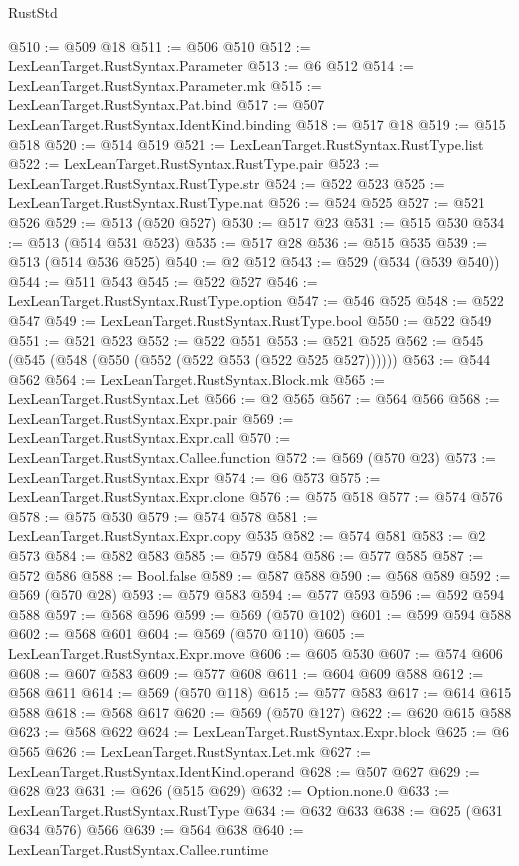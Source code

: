 \begin{lexlean}{RustStd}
\begin{coremodule}
@510 := @509 @18
@511 := @506 @510
@512 := LexLeanTarget.RustSyntax.Parameter
@513 := @6 @512
@514 := LexLeanTarget.RustSyntax.Parameter.mk
@515 := LexLeanTarget.RustSyntax.Pat.bind
@517 := @507 LexLeanTarget.RustSyntax.IdentKind.binding
@518 := @517 @18
@519 := @515 @518
@520 := @514 @519
@521 := LexLeanTarget.RustSyntax.RustType.list
@522 := LexLeanTarget.RustSyntax.RustType.pair
@523 := LexLeanTarget.RustSyntax.RustType.str
@524 := @522 @523
@525 := LexLeanTarget.RustSyntax.RustType.nat
@526 := @524 @525
@527 := @521 @526
@529 := @513 (@520 @527)
@530 := @517 @23
@531 := @515 @530
@534 := @513 (@514 @531 @523)
@535 := @517 @28
@536 := @515 @535
@539 := @513 (@514 @536 @525)
@540 := @2 @512
@543 := @529 (@534 (@539 @540))
@544 := @511 @543
@545 := @522 @527
@546 := LexLeanTarget.RustSyntax.RustType.option
@547 := @546 @525
@548 := @522 @547
@549 := LexLeanTarget.RustSyntax.RustType.bool
@550 := @522 @549
@551 := @521 @523
@552 := @522 @551
@553 := @521 @525
@562 := @545 (@545 (@548 (@550 (@552 (@522 @553 (@522 @525 @527))))))
@563 := @544 @562
@564 := LexLeanTarget.RustSyntax.Block.mk
@565 := LexLeanTarget.RustSyntax.Let
@566 := @2 @565
@567 := @564 @566
@568 := LexLeanTarget.RustSyntax.Expr.pair
@569 := LexLeanTarget.RustSyntax.Expr.call
@570 := LexLeanTarget.RustSyntax.Callee.function
@572 := @569 (@570 @23)
@573 := LexLeanTarget.RustSyntax.Expr
@574 := @6 @573
@575 := LexLeanTarget.RustSyntax.Expr.clone
@576 := @575 @518
@577 := @574 @576
@578 := @575 @530
@579 := @574 @578
@581 := LexLeanTarget.RustSyntax.Expr.copy @535
@582 := @574 @581
@583 := @2 @573
@584 := @582 @583
@585 := @579 @584
@586 := @577 @585
@587 := @572 @586
@588 := Bool.false
@589 := @587 @588
@590 := @568 @589
@592 := @569 (@570 @28)
@593 := @579 @583
@594 := @577 @593
@596 := @592 @594 @588
@597 := @568 @596
@599 := @569 (@570 @102)
@601 := @599 @594 @588
@602 := @568 @601
@604 := @569 (@570 @110)
@605 := LexLeanTarget.RustSyntax.Expr.move
@606 := @605 @530
@607 := @574 @606
@608 := @607 @583
@609 := @577 @608
@611 := @604 @609 @588
@612 := @568 @611
@614 := @569 (@570 @118)
@615 := @577 @583
@617 := @614 @615 @588
@618 := @568 @617
@620 := @569 (@570 @127)
@622 := @620 @615 @588
@623 := @568 @622
@624 := LexLeanTarget.RustSyntax.Expr.block
@625 := @6 @565
@626 := LexLeanTarget.RustSyntax.Let.mk
@627 := LexLeanTarget.RustSyntax.IdentKind.operand
@628 := @507 @627
@629 := @628 @23
@631 := @626 (@515 @629)
@632 := Option.none.{0}
@633 := LexLeanTarget.RustSyntax.RustType
@634 := @632 @633
@638 := @625 (@631 @634 @576) @566
@639 := @564 @638
@640 := LexLeanTarget.RustSyntax.Callee.runtime

\end{coremodule}
\end{lexlean}
